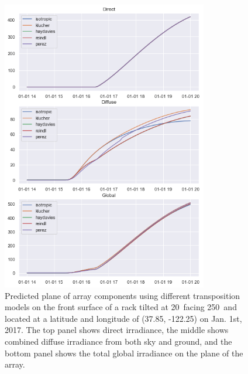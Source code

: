 \documentclass[conference]{IEEEtran}
\begin{document}
\begin{figure}
\centering
\includegraphics[width=9cm]{frontside_transposition.png}
\caption{Predicted plane of array components using different transposition models on the front surface of a rack tilted at 20\degree\ facing 250\degree\ and located at a latitude and longitude of (37.85\degree, -122.25\degree) on Jan. 1st, 2017.  The top panel shows direct irradiance, the middle shows combined diffuse irradiance from both sky and ground, and the bottom panel shows the total global irradiance on the plane of the array.}
\end{figure}
\end{document}
